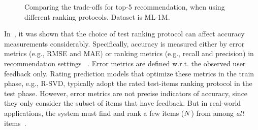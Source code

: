 \begin{figure}[t]
\centering





\caption{Comparing the trade-offs  for top-5 recommendation, when using different ranking protocols. Dataset is ML-1M.}

\label{fig:CP-LC-tradeoffs-ml-1m}
\end{figure}


In~\cite{steck2013evaluation}, it was shown  that  the choice of test ranking protocol can affect accuracy measurements considerably. Specifically,  accuracy is  measured either  by error metrics (e.g., RMSE and MAE) or ranking metrics (e.g., recall and precision) in  recommendation settings ~\cite{steck2013evaluation}. Error metrics are defined w.r.t.  the observed user feedback only.  Rating prediction models that optimize these metrics in the train phase, e.g., R-SVD, typically  adopt  the rated test-items ranking protocol in the test phase. However,  error metrics are not  precise indicators of  accuracy,  since they only consider the subset of items that have feedback. But  in real-world  applications, the system must find and rank  a  few items ($N$)  from among \emph{all} items~\cite{cremonesi2010performance,steck2013evaluation}. 


